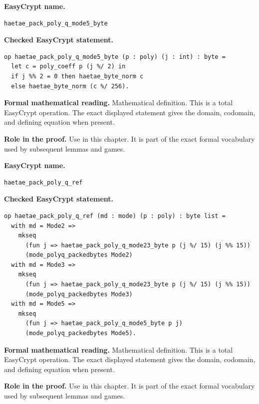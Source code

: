 \begin{formaldefinition}
\noindent\textbf{EasyCrypt name.}
\begin{lstlisting}[language=EasyCrypt,basicstyle=\ttfamily\scriptsize]
haetae_pack_poly_q_mode5_byte
\end{lstlisting}
\noindent\textbf{Checked EasyCrypt statement.}
\begin{lstlisting}[language=EasyCrypt,basicstyle=\ttfamily\scriptsize]
op haetae_pack_poly_q_mode5_byte (p : poly) (j : int) : byte =
  let c = poly_coeff p (j %/ 2) in
  if j %% 2 = 0 then haetae_byte_norm c
  else haetae_byte_norm (c %/ 256).
\end{lstlisting}
\noindent\textbf{Formal mathematical reading.}
Mathematical definition. This is a total EasyCrypt operation.  The exact displayed statement gives the domain, codomain, and defining equation when present.

\noindent\textbf{Role in the proof.}
Use in this chapter. It is part of the exact formal vocabulary used by subsequent lemmas and games.

\end{formaldefinition}

\begin{formaldefinition}
\noindent\textbf{EasyCrypt name.}
\begin{lstlisting}[language=EasyCrypt,basicstyle=\ttfamily\scriptsize]
haetae_pack_poly_q_ref
\end{lstlisting}
\noindent\textbf{Checked EasyCrypt statement.}
\begin{lstlisting}[language=EasyCrypt,basicstyle=\ttfamily\scriptsize]
op haetae_pack_poly_q_ref (md : mode) (p : poly) : byte list =
  with md = Mode2 =>
    mkseq
      (fun j => haetae_pack_poly_q_mode23_byte p (j %/ 15) (j %% 15))
      (mode_polyq_packedbytes Mode2)
  with md = Mode3 =>
    mkseq
      (fun j => haetae_pack_poly_q_mode23_byte p (j %/ 15) (j %% 15))
      (mode_polyq_packedbytes Mode3)
  with md = Mode5 =>
    mkseq
      (fun j => haetae_pack_poly_q_mode5_byte p j)
      (mode_polyq_packedbytes Mode5).
\end{lstlisting}
\noindent\textbf{Formal mathematical reading.}
Mathematical definition. This is a total EasyCrypt operation.  The exact displayed statement gives the domain, codomain, and defining equation when present.

\noindent\textbf{Role in the proof.}
Use in this chapter. It is part of the exact formal vocabulary used by subsequent lemmas and games.

\end{formaldefinition}

